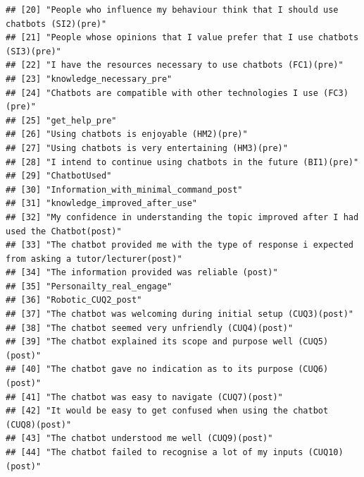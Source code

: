 \documentclass[a4paper, nobind]{templates/ociamthesis}
\begin{document}
\begin{verbatim}
## [20] "People who influence my behaviour think that I should use chatbots (SI2)(pre)"                  
## [21] "People whose opinions that I value prefer that I use chatbots (SI3)(pre)"                       
## [22] "I have the resources necessary to use chatbots (FC1)(pre)"                                      
## [23] "knowledge_necessary_pre"                                                                        
## [24] "Chatbots are compatible with other technologies I use (FC3)(pre)"                               
## [25] "get_help_pre"                                                                                   
## [26] "Using chatbots is enjoyable (HM2)(pre)"                                                         
## [27] "Using chatbots is very entertaining (HM3)(pre)"                                                 
## [28] "I intend to continue using chatbots in the future (BI1)(pre)"                                   
## [29] "ChatbotUsed"                                                                                    
## [30] "Information_with_minimal_command_post"                                                          
## [31] "knowledge_improved_after_use"                                                                   
## [32] "My confidence in understanding the topic improved after I had used the Chatbot(post)"           
## [33] "The chatbot provided me with the type of response i expected from asking a tutor/lecturer(post)"
## [34] "The information provided was reliable (post)"                                                   
## [35] "Personailty_real_engage"                                                                        
## [36] "Robotic_CUQ2_post"                                                                              
## [37] "The chatbot was welcoming during initial setup (CUQ3)(post)"                                    
## [38] "The chatbot seemed very unfriendly (CUQ4)(post)"                                                
## [39] "The chatbot explained its scope and purpose well (CUQ5)(post)"                                  
## [40] "The chatbot gave no indication as to its purpose (CUQ6)(post)"                                  
## [41] "The chatbot was easy to navigate (CUQ7)(post)"                                                  
## [42] "It would be easy to get confused when using the chatbot (CUQ8)(post)"                           
## [43] "The chatbot understood me well (CUQ9)(post)"                                                    
## [44] "The chatbot failed to recognise a lot of my inputs (CUQ10)(post)"                               

\end{verbatim}
\end{document}
